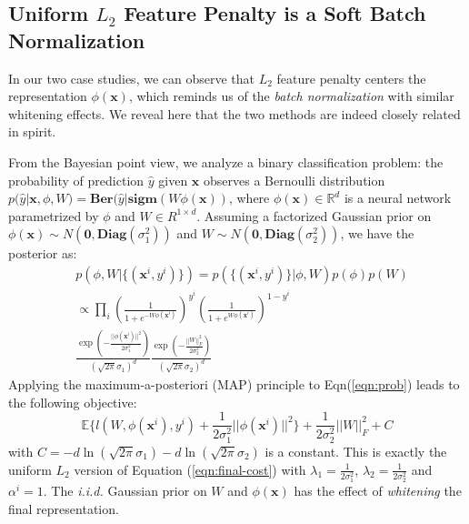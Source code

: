 \subsection{Uniform $L_2$ Feature Penalty is a Soft Batch Normalization}
\label{sec:theoretical}
In our two case studies, we can observe that $L_2$ feature penalty centers the representation $\phi(\mathbf{x})$, which reminds us of the \textit{batch normalization} \cite{batch-normalization} with similar whitening effects.
We reveal here that the two methods are indeed closely related in spirit.

From the Bayesian point view, we analyze a binary classification problem: the probability of prediction $\hat{y}$ given $\mathbf{x}$ observes a Bernoulli distribution $p(\hat{y}|\mathbf{x},\phi,W)=\mathbf{Ber}(\hat{y}|\mathbf{sigm}(W\phi(\mathbf{x}))$, where  $\phi(\mathbf{x})\in\mathbb{R}^d$ is a neural network parametrized by $\phi$ and $W\in R^{1\times d}$. Assuming a factorized Gaussian prior on $\phi(\mathbf{x})\sim N(\mathbf{0},\mathbf{Diag}(\sigma_1^2))$ and $W\sim N( \mathbf{0},\mathbf{Diag}(\sigma_2^2))$, we have the posterior as:
\begin{equation}
\begin{split}
&p(\phi,W|\{(\mathbf{x}^i,y^i)\})=p(\{(\mathbf{x}^i,y^i)\}|\phi,W)p(\phi)p(W)\\
&\propto\prod_i(\frac{1}{1+e^{-W\phi(\mathbf{x}^i)}})^{y^i}(\frac{1}{1+e^{W\phi(\mathbf{x}^i)}})^{1-y^i}\\
&\frac{\exp(-\frac{||\phi(\mathbf{x}^i)||^2}{2\sigma_1^2})}{(\sqrt{2\pi}\sigma_1)^d}\frac{\exp(-\frac{||W||_F^2}{2\sigma_2^2})}{(\sqrt{2\pi}\sigma_2)^d}
\end{split}
\label{eqn:prob}
\end{equation}
Applying the maximum-a-posteriori (MAP) principle to Eqn(\ref{eqn:prob}) leads to the following objective: %
\begin{equation}
\mathbb{E}\{l(W,\phi(\mathbf{x}^i),y^i)+\frac{1}{2\sigma_1^2}||\phi(\mathbf{x}^i)||^2\}+\frac{1}{2\sigma_2^2}||W||_F^2+C
\end{equation}
with $C=-d\ln(\sqrt{2\pi}\sigma_1)-d\ln(\sqrt{2\pi}\sigma_2)$ is a constant. This is exactly the uniform $L_2$ version of Equation (\ref{eqn:final-cost}) with $\lambda_1=\frac{1}{2\sigma_1^2}$, $\lambda_2=\frac{1}{2\sigma_2^2}$ and $\alpha^i=1$. The \textit{i.i.d.} Gaussian prior on $W$ and $\phi(\mathbf{x})$ has the effect of \textit{whitening} the final representation.

